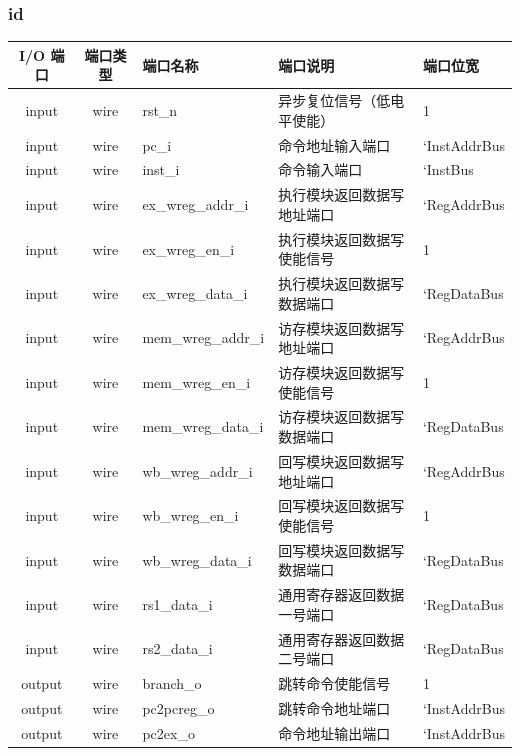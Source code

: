 \documentclass[lang=cn,11pt,a4paper,chinesefont=founder]{elegantpaper}
\begin{document}
\subsubsection{id}
\begin{tabular}{cclll}
    \toprule
    I/O 端口 & 端口类型 & 端口名称           & 端口说明                   & 端口位宽     \\
    \midrule
    input    & wire     & rst\_n             & 异步复位信号（低电平使能） & 1            \\
    input    & wire     & pc\_i              & 命令地址输入端口           & `InstAddrBus \\
    input    & wire     & inst\_i            & 命令输入端口               & `InstBus     \\
    input    & wire     & ex\_wreg\_addr\_i  & 执行模块返回数据写地址端口 & `RegAddrBus  \\
    input    & wire     & ex\_wreg\_en\_i    & 执行模块返回数据写使能信号 & 1            \\
    input    & wire     & ex\_wreg\_data\_i  & 执行模块返回数据写数据端口 & `RegDataBus  \\
    input    & wire     & mem\_wreg\_addr\_i & 访存模块返回数据写地址端口 & `RegAddrBus  \\
    input    & wire     & mem\_wreg\_en\_i   & 访存模块返回数据写使能信号 & 1            \\
    input    & wire     & mem\_wreg\_data\_i & 访存模块返回数据写数据端口 & `RegDataBus  \\
    input    & wire     & wb\_wreg\_addr\_i  & 回写模块返回数据写地址端口 & `RegAddrBus  \\
    input    & wire     & wb\_wreg\_en\_i    & 回写模块返回数据写使能信号 & 1            \\
    input    & wire     & wb\_wreg\_data\_i  & 回写模块返回数据写数据端口 & `RegDataBus  \\
    input    & wire     & rs1\_data\_i       & 通用寄存器返回数据一号端口 & `RegDataBus  \\
    input    & wire     & rs2\_data\_i       & 通用寄存器返回数据二号端口 & `RegDataBus  \\
    output   & wire     & branch\_o          & 跳转命令使能信号           & 1            \\
    output   & wire     & pc2pcreg\_o        & 跳转命令地址端口           & `InstAddrBus \\
    output   & wire     & pc2ex\_o           & 命令地址输出端口           & `InstAddrBus \\

\end{tabular}
\end{document}
